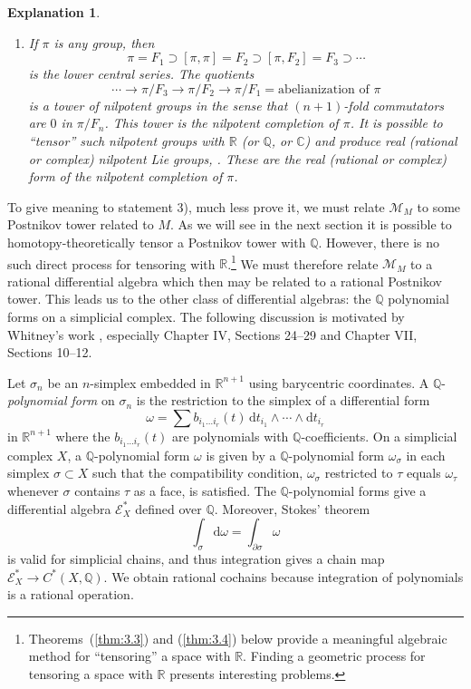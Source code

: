\documentclass[11pt]{amsart}
\theoremstyle{plain}
\newtheorem{explanation}[theorem]{Explanation}
\theoremstyle{definition}
\newcommand{\sE}{\mathscr{E}}
\newcommand{\cM}{\mathcal{M}}
\newcommand{\dd}{\mathrm{d}}
\newcommand{\CC}{\mathbb{C}}
\newcommand{\RR}{\mathbb{R}}
\newcommand{\QQ}{\mathbb{Q}}
\begin{document}
\begin{explanation}%
\begin{enumerate}
\item[1)] If $\pi$ is any group, then
\[
\pi = F_{1} \supset [\pi, \pi] = F_{2} \supset [\pi, F_{2}] = F_{3} \supset \cdots
\]
is the lower central series. The quotients
\[
\cdots \to \pi/F_{3} \to \pi/F_{2} \to \pi/F_{1} = \text{abelianization of } \pi
\]
is a tower of nilpotent groups in the sense that $(n+1)$-fold commutators are $0$ in $\pi/F_{n}$. This tower is the \emph{nilpotent completion} of $\pi$. It is possible to ``tensor'' such nilpotent groups with $\RR$ (or $\QQ$, or $\CC$) and produce real (rational or complex) nilpotent Lie groups, \cite{BK,M}. These are the real (rational or complex) form of the nilpotent completion of $\pi$.
\end{enumerate}
\end{explanation}

To give meaning to statement 3), much less prove it, we must relate $\cM_{M}$ to some Postnikov tower related to $M$. As we will see in the next section it is possible to homotopy-theoretically tensor a Postnikov tower with $\QQ$. However, there is no such direct process for tensoring with $\RR$.\footnote{Theorems~(\ref{thm:3.3}) and (\ref{thm:3.4}) below provide a meaningful algebraic method for ``tensoring'' a space with $\RR$. Finding a geometric process for tensoring a space with $\RR$ presents interesting problems.} We must therefore relate $\cM_{M}$ to a rational differential algebra which then may be related to a rational Postnikov tower. This leads us to the other class of differential algebras: the $\QQ$ polynomial forms on a simplicial complex. The following discussion is motivated by Whitney's work \cite{Wh1}, especially Chapter IV, Sections 24--29 and Chapter VII, Sections 10--12.

Let $\sigma_{n}$ be an $n$-simplex embedded in $\RR^{n+1}$ using barycentric coordinates. A $\QQ$-\emph{polynomial form} on $\sigma_{n}$ is the restriction to the simplex of a differential form
\[
\omega = \sum b_{i_{1} \ldots i_{r}}(t)\, \dd t_{i_{1}} \wedge \cdots \wedge \dd t_{i_{r}}
\]
in $\RR^{n+1}$ where the $b_{i_{1} \ldots i_{r}}(t)$ are polynomials with $\QQ$-coefficients. On a simplicial complex $X$, a $\QQ$-polynomial form $\omega$ is given by a $\QQ$-polynomial form $\omega_{\sigma}$ in each simplex $\sigma \subset X$ such that the compatibility condition, $\omega_{\sigma}$ restricted to $\tau$ equals $\omega_{\tau}$ whenever $\sigma$ contains $\tau$ as a face, is satisfied. The $\QQ$-polynomial forms give a differential algebra $\sE^{*}_{X}$ defined over $\QQ$. Moreover, Stokes' theorem
\[
\int_{\sigma} \dd\omega = \int_{\partial\sigma} \omega
\]
is valid for simplicial chains, and thus integration gives a chain map $\sE^{*}_{X} \to C^{*}(X, \QQ)$. We obtain rational cochains because integration of polynomials is a rational operation.
\end{document}
